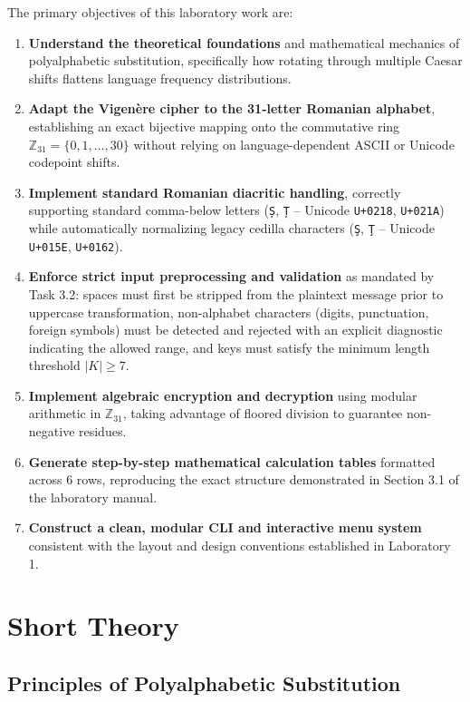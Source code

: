 \documentclass{labreport}
\begin{document}
The primary objectives of this laboratory work are:
\begin{enumerate}[leftmargin=*]
    \item \textbf{Understand the theoretical foundations} and mathematical mechanics of polyalphabetic substitution, specifically how rotating through multiple Caesar shifts flattens language frequency distributions.
    \item \textbf{Adapt the Vigenère cipher to the 31-letter Romanian alphabet}, establishing an exact bijective mapping onto the commutative ring $\mathbb{Z}_{31} = \{0, 1, \dots, 30\}$ without relying on language-dependent ASCII or Unicode codepoint shifts.
    \item \textbf{Implement standard Romanian diacritic handling}, correctly supporting standard comma-below letters (\texttt{Ș}, \texttt{Ț} -- Unicode \texttt{U+0218}, \texttt{U+021A}) while automatically normalizing legacy cedilla characters (\texttt{Ş}, \texttt{Ţ} -- Unicode \texttt{U+015E}, \texttt{U+0162}).
    \item \textbf{Enforce strict input preprocessing and validation} as mandated by Task 3.2: spaces must first be stripped from the plaintext message prior to uppercase transformation, non-alphabet characters (digits, punctuation, foreign symbols) must be detected and rejected with an explicit diagnostic indicating the allowed range, and keys must satisfy the minimum length threshold $|K| \ge 7$.
    \item \textbf{Implement algebraic encryption and decryption} using modular arithmetic in $\mathbb{Z}_{31}$, taking advantage of floored division to guarantee non-negative residues.
    \item \textbf{Generate step-by-step mathematical calculation tables} formatted across 6 rows, reproducing the exact structure demonstrated in Section 3.1 of the laboratory manual.
    \item \textbf{Construct a clean, modular CLI and interactive menu system} consistent with the layout and design conventions established in Laboratory 1.
\end{enumerate}

\section{Short Theory}

\subsection{Principles of Polyalphabetic Substitution}
\end{document}
